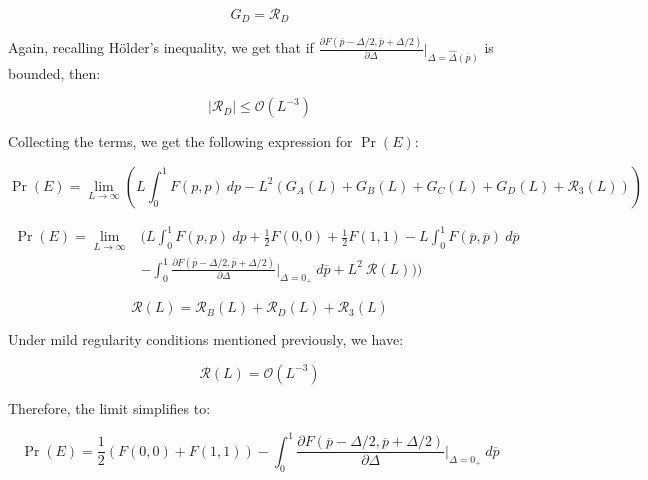 \documentclass{article}
\theoremstyle{definition}
\begin{document}
\begin{equation}
    G_D = \mathcal{R}_D
\end{equation}

Again, recalling Hölder's inequality, we get that
if $\frac{\partial
    F(\overline{p} - \Delta/2, \overline{p} + \Delta/2) 
    }{\partial \Delta}
    \Big |_{\Delta=\hat{\Delta}(\overline{p})}$ is bounded, then:



\begin{equation}
    |\mathcal{R}_D|
    \le
    \mathcal{O}(L^{-3})
\end{equation}

Collecting the terms, we get the following expression for $\Pr(E)$:

\begin{equation}
 \Pr(E) = \lim_{L \to \infty} 
    \left (
    L \int_{0}^1 F(p,p) \ dp - 
    L^2 (G_A(L) + G_B(L) + G_C(L) + G_D(L) + \mathcal{R}_3(L))
    \right )
\end{equation}


\begin{equation}
\begin{split}
 \Pr(E) = \lim_{L \to \infty} 
    & \Big (
    L \int_{0}^1 F(p,p) \ dp + 
    \frac{1}{2} F(0,0) + \frac{1}{2} F(1,1)
    - L \int_{0}^1 F(\overline{p},\overline{p}) \ d\overline{p}
     \\
    &- \int_0^1
    \frac{\partial
    F(\overline{p} - \Delta/2, \overline{p} + \Delta/2) 
    }{\partial \Delta}
    \Bigg |_{\Delta=0_+}
    \ d\overline{p} +
    L^2 \ \mathcal{R}(L))
    \Big )
\end{split}
\end{equation}

\begin{equation}
    \mathcal{R}(L)
    =
    \mathcal{R}_B(L) +
    \mathcal{R}_D(L) +
    \mathcal{R}_3(L)
\end{equation}

Under mild regularity conditions mentioned previously, we have:

\begin{equation}
    \mathcal{R}(L)
    =
    \mathcal{O}(L^{-3})
\end{equation}

Therefore, the limit simplifies to:

\begin{equation}
\label{eq:PrE_Formula}
\boxed{
    \Pr(E) 
    = 
    \frac{1}{2} \left ( F(0,0)+F(1,1) \right ) 
    - \int_0^1
    \frac{\partial
    F(\overline{p} - \Delta/2, \overline{p} + \Delta/2) 
    }{\partial \Delta}
    \Bigg |_{\Delta=0_+}
    \ d\overline{p}
    }
\end{equation}
\end{document}
